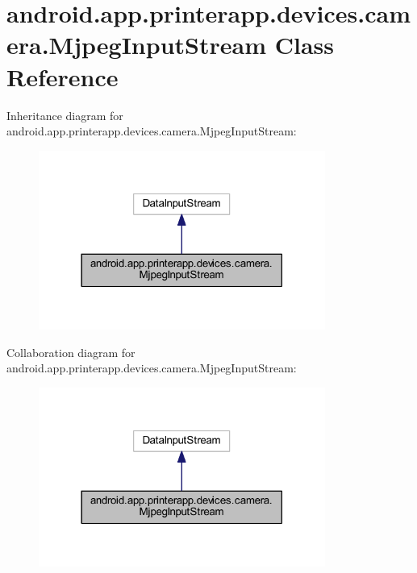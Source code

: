 \hypertarget{classandroid_1_1app_1_1printerapp_1_1devices_1_1camera_1_1_mjpeg_input_stream}{}\section{android.\+app.\+printerapp.\+devices.\+camera.\+Mjpeg\+Input\+Stream Class Reference}
\label{classandroid_1_1app_1_1printerapp_1_1devices_1_1camera_1_1_mjpeg_input_stream}


Inheritance diagram for android.\+app.\+printerapp.\+devices.\+camera.\+Mjpeg\+Input\+Stream\+:
\nopagebreak
\begin{figure}[H]
\begin{center}
\leavevmode
\includegraphics[width=266pt]{classandroid_1_1app_1_1printerapp_1_1devices_1_1camera_1_1_mjpeg_input_stream__inherit__graph}
\end{center}
\end{figure}


Collaboration diagram for android.\+app.\+printerapp.\+devices.\+camera.\+Mjpeg\+Input\+Stream\+:
\nopagebreak
\begin{figure}[H]
\begin{center}
\leavevmode
\includegraphics[width=266pt]{classandroid_1_1app_1_1printerapp_1_1devices_1_1camera_1_1_mjpeg_input_stream__coll__graph}
\end{center}
\end{figure}
